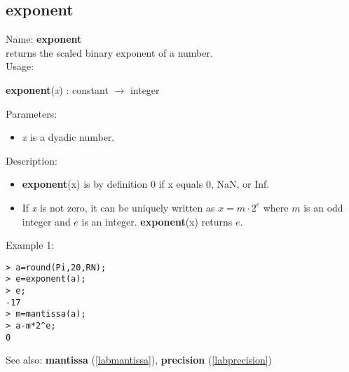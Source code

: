 \subsection{exponent}
\label{labexponent}
\noindent Name: \textbf{exponent}\\
returns the scaled binary exponent of a number.\\
\noindent Usage: 
\begin{center}
\textbf{exponent}(\emph{x}) : \textsf{constant} $\rightarrow$ \textsf{integer}
\\ 
\end{center}
Parameters: 
\begin{itemize}
\item \emph{x} is a dyadic number.
\end{itemize}
\noindent Description: \begin{itemize}

\item \textbf{exponent}(x) is by definition 0 if x equals 0, NaN, or Inf.

\item If \emph{x} is not zero, it can be uniquely written as $x = m \cdot 2^e$ where
   $m$ is an odd integer and $e$ is an integer. \textbf{exponent}(x) returns $e$. 
\end{itemize}
\noindent Example 1: 
\begin{center}\begin{minipage}{15cm}\begin{Verbatim}[frame=single]
> a=round(Pi,20,RN);
> e=exponent(a);
> e;
-17
> m=mantissa(a);
> a-m*2^e;
0
\end{Verbatim}
\end{minipage}\end{center}
See also: \textbf{mantissa} (\ref{labmantissa}), \textbf{precision} (\ref{labprecision})
